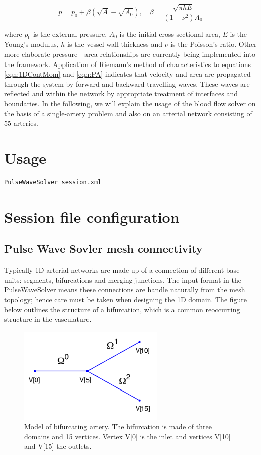 \begin{equation}
p=p_{0}+\beta\left(\sqrt{A}-\sqrt{A_{0}}\right), \quad \beta=\frac{\sqrt{\pi h E}}{(1-\nu^{2})A_{0}}
\label{eqn:PA}
\end{equation}

where $p_{0}$ is the external pressure, $A_{0}$ is the initial cross-sectional area, $E$ is the Young's modulus, $h$ is the vessel wall thickness and $\nu$ is the Poisson's ratio. Other more elaborate pressure - area relationships are currently being implemented into the framework. Application of Riemann's method of characteristics to equations \ref{eqn:1DContMom} and \ref{eqn:PA} indicates that velocity and area are propagated through the system by forward and backward travelling waves. These waves are reflected and within the network by appropriate treatment of interfaces and boundaries. In the following, we will explain
the usage of the blood flow solver on the basis of a single-artery problem and
also on an arterial network consisting of $55$ arteries.

\section{Usage}
\begin{lstlisting}[style=BashInputStyle]
PulseWaveSolver session.xml
\end{lstlisting}

\section{Session file configuration}

\subsection{Pulse Wave Sovler mesh connectivity}
Typically 1D arterial networks are made up of a connection of different base units: segments, bifurcations and merging junctions. The input format in the PulseWaveSolver means these connections are handle naturally from the mesh topology; hence care must be taken when designing the 1D domain. The figure below outlines the structure of a bifurcation, which is a common reoccurring structure in the vasculature.

\begin{figure}
\begin{center}
\includegraphics[width=7cm]{Figures/PulseWaveBifurcation.png}
\caption{Model of bifurcating artery. The bifurcation is made of three domains and 15 vertices. Vertex V[0] is the inlet and vertices V[10] and V[15] the outlets.}
\end{center}
\end{figure}

